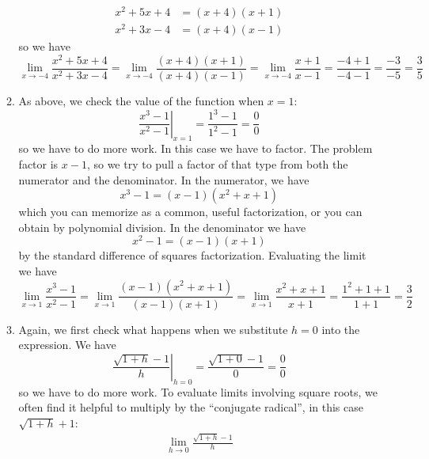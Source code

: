 \documentclass{article}
\begin{document}
\begin{enumerate}
\begin{enumerate}
    \begin{align*}
      x^2+5x+4 &= (x+4)(x+1) \\
      x^2+3x-4 &= (x+4)(x-1)
    \end{align*}
    so we have
    \begin{equation*}
      \lim_{x\to -4} \frac{x^2+5x+4}{x^2+3x-4}
      = \lim_{x\to -4} \frac{(x+4)(x+1)}{(x+4)(x-1)}
      = \lim_{x\to -4} \frac{x+1}{x-1} 
      = \frac{-4+1}{-4-1}
      = \frac{-3}{-5} = \frac{3}{5}
    \end{equation*}
  \item %
    As above, we check the value of the function
    when $x=1$: 
    \begin{equation*}
      \left. \frac{x^3-1}{x^2-1} \right|_{x=1}
      = \frac{1^3-1}{1^2-1} = \frac{0}{0}
    \end{equation*}
    so we have to do more work.  In this case we have to factor.
    The problem factor is $x-1$, so we try to pull a factor of that type 
    from both the numerator and the denominator.  In the numerator, we have
    \begin{equation*}
      x^3-1=(x-1)(x^2+x+1)
    \end{equation*}
    which you can memorize as a common, useful factorization, or you can obtain
    by polynomial division.  In the denominator we have
    \begin{equation*}
      x^2-1 = (x-1)(x+1)
    \end{equation*}
    by the standard difference of squares factorization.  Evaluating the limit
    we have
    \begin{equation*}
      \lim_{x\to 1} \frac{x^3-1}{x^2-1} 
      = \lim_{x\to 1} \frac{(x-1)(x^2+x+1)}{(x-1)(x+1)}
      = \lim_{x\to 1} \frac{x^2+x+1}{x+1}
      = \frac{1^2+1+1}{1+1} = \frac{3}{2}
    \end{equation*}
  \item %
    Again, we first check what happens when we substitute $h=0$ into the
    expression.  We have
    \begin{equation*}
      \left. \frac{\sqrt{1+h}-1}{h} \right|_{h=0}
      = \frac{\sqrt{1+0}-1}{0} = \frac{0}{0}
    \end{equation*}
    so we have to do more work.
    To evaluate limits involving square roots, we often find it helpful to 
    multiply by the ``conjugate radical'', in this case $\sqrt{1+h} + 1$:
    \begin{multline*}
      \lim_{h\to 0} \frac{\sqrt{1+h}-1}{h}

\end{multline*}
\end{enumerate}
\end{enumerate}
\end{document}
